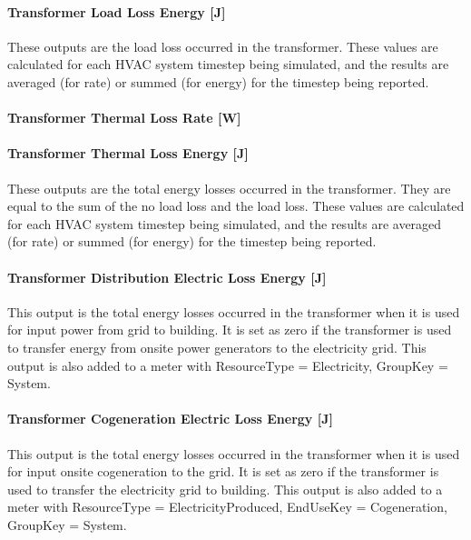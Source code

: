 \paragraph{Transformer Load Loss Energy {[}J{]}}\label{transformer-load-loss-energy-j}

These outputs are the load loss occurred in the transformer. These values are calculated for each HVAC system timestep being simulated, and the results are averaged (for rate) or summed (for energy) for the timestep being reported.

\paragraph{Transformer Thermal Loss Rate {[}W{]}}\label{transformer-thermal-loss-rate-w}

\paragraph{Transformer Thermal Loss Energy {[}J{]}}\label{transformer-thermal-loss-energy-j}

These outputs are the total energy losses occurred in the transformer. They are equal to the sum of the no load loss and the load loss. These values are calculated for each HVAC system timestep being simulated, and the results are averaged (for rate) or summed (for energy) for the timestep being reported.

\paragraph{Transformer Distribution Electric Loss Energy {[}J{]}}\label{transformer-distribution-electric-loss-energy-j}

This output is the total energy losses occurred in the transformer when it is used for input power from grid to building. It is set as zero if the transformer is used to transfer energy from onsite power generators to the electricity grid. This output is also added to a meter with ResourceType = Electricity, GroupKey = System.

\paragraph{Transformer Cogeneration Electric Loss Energy {[}J{]}}\label{transformer-cogeneration-electric-loss-energy-j}

This output is the total energy losses occurred in the transformer when it is used for input onsite cogeneration to the grid. It is set as zero if the transformer is used to transfer the electricity grid to building. This output is also added to a meter with ResourceType = ElectricityProduced, EndUseKey = Cogeneration, GroupKey = System.

